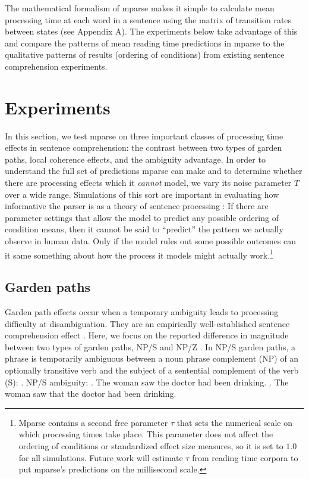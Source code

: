 \documentclass[a4paper, 12pt]{article}
\begin{document}
The mathematical formalism of mparse makes it simple to calculate mean
processing time at each word in a sentence using the matrix of transition rates
between states (see Appendix A). The experiments below take advantage of this
and compare the patterns of mean reading time predictions in mparse to the
qualitative patterns of results (ordering of conditions) from existing sentence
comprehension experiments.

\section{Experiments}
In this section, we test mparse on three important classes of processing time
effects in sentence comprehension: the contrast between two types of garden
paths, local coherence effects, and the ambiguity advantage. In order to
understand the full set of predictions mparse can make and to determine whether
there are processing effects which it \emph{cannot} model, we vary its noise
parameter $T$ over a wide range. Simulations of this sort are important in
evaluating how informative the parser is as a theory of sentence processing
\citep{roberts2000how}: If there are parameter settings that allow the model to
predict any possible ordering of condition means, then it cannot be said to
``predict'' the pattern we actually observe in human data. Only if the model
rules out some possible outcomes can it same something about how the process it
models might actually work.\footnote{Mparse contains a second
    free parameter $\tau$ that sets the numerical scale on which processing
    times take place. This parameter does not affect the ordering of conditions
    or standardized effect size measures, so it is set to $1.0$ for all
    simulations. Future work will estimate $\tau$ from reading time corpora to
    put mparse's predictions on the millisecond scale.}

\subsection{Garden paths}
Garden path effects occur when a temporary ambiguity leads to processing difficulty
at disambiguation. They are an empirically well-established sentence comprehension
effect \citep{bever1970cognitive, frazier1978sausage, kimball1973seven}. Here, we focus on the
reported difference in magnitude between two types of garden paths, NP/S and
NP/Z \citep{sturt1999structural, grodner2003against, prasad2019how,
    sturt1997thematic}. In NP/S garden paths, a phrase is temporarily ambiguous
between a noun phrase complement (NP) of an optionally transitive verb and the
subject of a sentential complement of the verb (S): \ex. NP/S ambiguity:
\a.\label{ex:nps-amb} The woman saw the doctor had been drinking.
\b.\label{ex:nps-unamb} The woman saw that the doctor had been drinking.
\end{document}
